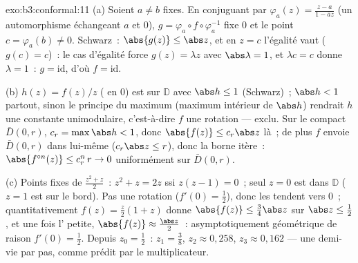 \begin{solution}{exo:b3:conformal:11}
(a) Soient $a \neq b$ fixes. En conjuguant par $\varphi_a(z)
= \frac{z - a}{1 - \bar az}$ (un automorphisme échangeant
$a$ et $0$), $g = \varphi_a\circ f\circ\varphi_a^{-1}$ fixe
$0$ et le point $c = \varphi_a(b) \neq 0$. Schwarz~:
$\abs{g(z)} \leq \abs z$, et en $z = c$ l'égalité vaut
($g(c) = c$)~: le cas d'égalité force $g(z) = \lambda z$
avec $\abs\lambda = 1$, et $\lambda c = c$ donne $\lambda =
1$~: $g = \mathrm{id}$, d'où $f = \mathrm{id}$.

(b) $h(z) = f(z)/z$ ( en $0$) est
 sur $\mathbb D$ avec $\abs h \leq 1$
(Schwarz)~; $\abs h < 1$ partout, sinon le principe du
maximum (maximum intérieur de $\abs h$) rendrait $h$ une
constante unimodulaire, c'est-à-dire $f$ une rotation ---
exclu. Sur le compact $\bar D(0,r)$, $c_r = \max\abs h <
1$, donc $\abs{f(z)} \leq c_r\abs z$ là~; de plus $f$ envoie
$\bar D(0,r)$ dans lui-même ($c_r\abs z \leq r$), donc la
borne itère~: $\abs{f^{\circ n}(z)} \leq c_r^n\,r \to 0$
uniformément sur $\bar D(0, r)$.

(c) Points fixes de $\frac{z^2 + z}2$~: $z^2 + z = 2z$ ssi
$z(z - 1) = 0$~; seul $z = 0$ est dans $\mathbb D$ ($z = 1$
est sur le bord). Pas une rotation ($f'(0) = \frac12$),
donc les  tendent vers $0$~; quantitativement $f(z)
= \frac z2(1 + z)$ donne $\abs{f(z)} \leq \frac{3}{4}\abs
z$ sur $\abs z \leq \frac12$, et une fois l' petite,
$\abs{f(z)} \approx \frac{\abs z}2$~: asymptotiquement
géométrique de raison $f'(0) = \frac12$. Depuis $z_0 =
\frac12$~: $z_1 = \frac38$, $z_2 \approx 0{,}258$, $z_3
\approx 0{,}162$ --- une demi-vie par pas, comme prédit par
le multiplicateur.
\end{solution}

